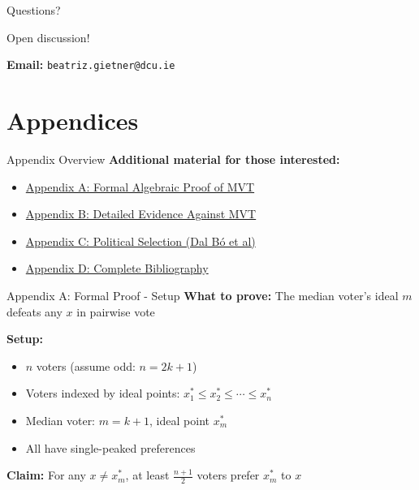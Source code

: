 \documentclass[10pt]{beamer}
\begin{document}
\begin{frame}{Questions?}
\begin{center}
\Large Open discussion!

\vspace{1cm}
\textbf{Email:} \texttt{beatriz.gietner@dcu.ie}
\end{center}
\end{frame}



\appendix

\section*{Appendices}

\begin{frame}{Appendix Overview}
\textbf{Additional material for those interested:}


\begin{itemize}
\item \hyperlink{formal-proof}{Appendix A: Formal Algebraic Proof of MVT}
\item \hyperlink{evidence-against}{Appendix B: Detailed Evidence Against MVT}
\item \hyperlink{dal-bo}{Appendix C: Political Selection (Dal Bó et al)}
\item \hyperlink{bibliography}{Appendix D: Complete Bibliography}
\end{itemize}
\end{frame}

\begin{frame}[label=formal-proof]{Appendix A: Formal Proof - Setup}
\hypertarget{formal-proof}{}
\textbf{What to prove:} The median voter's ideal $m$ defeats any $x$ in pairwise vote


\textbf{Setup:}
\begin{itemize}
\item $n$ voters (assume odd: $n = 2k+1$)
\item Voters indexed by ideal points: $x_1^* \leq x_2^* \leq \cdots \leq x_n^*$
\item Median voter: $m = k+1$, ideal point $x_m^*$
\item All have single-peaked preferences
\end{itemize}


\textbf{Claim:} For any $x \neq x_m^*$, at least $\frac{n+1}{2}$ voters prefer $x_m^*$ to $x$


\small{\hyperlink{visual-proof}{}}
\end{frame}
\end{document}
